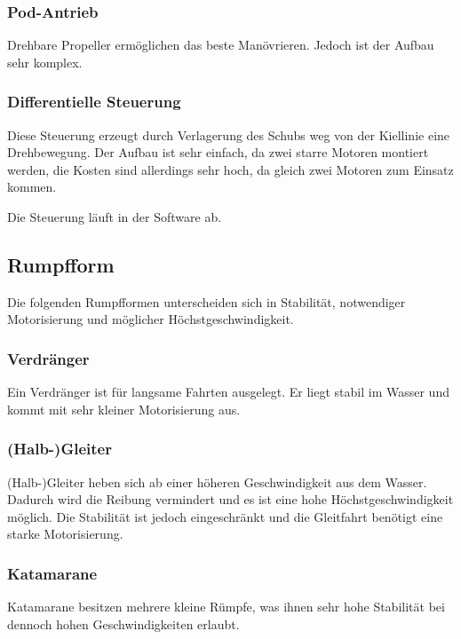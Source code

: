 \documentclass[a4paper]{article}
\begin{document}
\subsubsection{Pod-Antrieb}

Drehbare Propeller ermöglichen das beste Manövrieren. Jedoch ist der Aufbau sehr komplex.

\subsubsection{Differentielle Steuerung}

Diese Steuerung erzeugt durch Verlagerung des Schubs weg von der Kiellinie eine Drehbewegung. Der 
Aufbau ist sehr einfach, da zwei starre Motoren montiert werden, die Kosten sind allerdings sehr 
hoch, da gleich zwei Motoren zum Einsatz kommen.

Die Steuerung läuft in der Software ab.

\subsection{Rumpfform}

Die folgenden Rumpfformen unterscheiden sich in Stabilität, notwendiger Motorisierung und 
möglicher Höchstgeschwindigkeit.

\subsubsection{Verdränger}

Ein Verdränger ist für langsame Fahrten ausgelegt. Er liegt stabil im Wasser und kommt mit sehr 
kleiner Motorisierung aus.

\subsubsection{(Halb-)Gleiter}

(Halb-)Gleiter heben sich ab einer höheren Geschwindigkeit aus dem Wasser. Dadurch wird die 
Reibung vermindert und es ist eine hohe Höchstgeschwindigkeit möglich. Die Stabilität ist jedoch 
eingeschränkt und die Gleitfahrt benötigt eine starke Motorisierung.

\subsubsection{Katamarane}

Katamarane besitzen mehrere kleine Rümpfe, was ihnen sehr hohe Stabilität bei dennoch hohen 
Geschwindigkeiten erlaubt.
\end{document}
